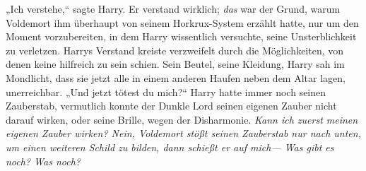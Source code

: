 „Ich verstehe,“ sagte Harry.
Er verstand wirklich; \emph{das} war der Grund, warum Voldemort ihm überhaupt von seinem Horkrux-System erzählt hatte, nur um den Moment vorzubereiten, in dem Harry wissentlich versuchte, seine Unsterblichkeit zu verletzen. Harrys Verstand kreiste verzweifelt durch die Möglichkeiten, von denen keine hilfreich zu sein schien. Sein Beutel, seine Kleidung, Harry sah im Mondlicht, dass sie jetzt alle in einem anderen Haufen neben dem Altar lagen, unerreichbar.
„Und jetzt tötest du mich?“
Harry hatte immer noch seinen Zauberstab, vermutlich konnte der Dunkle Lord seinen eigenen Zauber nicht darauf wirken, oder seine Brille, wegen der Disharmonie.
\emph{Kann ich zuerst meinen eigenen Zauber wirken? Nein, Voldemort stößt seinen Zauberstab nur nach unten, um einen weiteren Schild zu bilden, dann schießt er auf mich— Was gibt es noch? \emph{Was noch?}}

